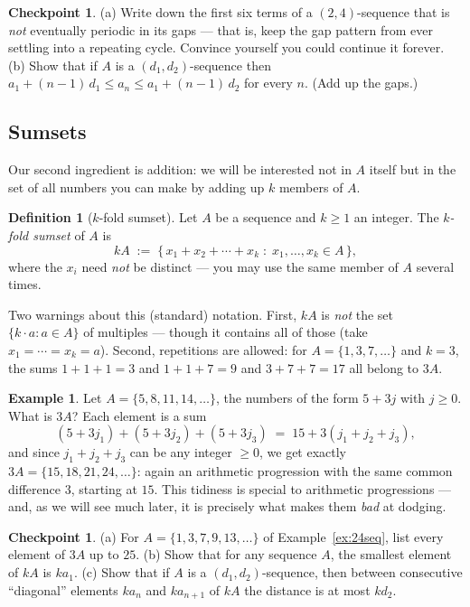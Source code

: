 \documentclass[11pt,reqno]{amsart}
\theoremstyle{plain}
\theoremstyle{definition}
\newtheorem{definition}[theorem]{Definition}
\newtheorem{example}[theorem]{Example}
\newtheorem{checkpoint}[theorem]{Checkpoint}   %
\theoremstyle{remark}
\begin{document}
\begin{checkpoint}
(a) Write down the first six terms of a $(2,4)$-sequence that is \emph{not} eventually
periodic in its gaps --- that is, keep the gap pattern from ever settling into a
repeating cycle. Convince yourself you could continue it forever.
(b) Show that if $A$ is a $(d_1,d_2)$-sequence then
$a_1 + (n-1)\,d_1 \le a_n \le a_1 + (n-1)\,d_2$ for every $n$. (Add up the gaps.)
\end{checkpoint}

\subsection{Sumsets}

Our second ingredient is addition: we will be interested not in $A$ itself but in the
set of all numbers you can make by adding up $k$ members of $A$.

\begin{definition}[$k$-fold sumset]\label{def:sumset}
Let $A$ be a sequence and $k \ge 1$ an integer. The \emph{$k$-fold sumset} of $A$ is
\[
  kA \;:=\; \{\, x_1 + x_2 + \cdots + x_k \;:\; x_1, \dots, x_k \in A \,\},
\]
where the $x_i$ need \emph{not} be distinct --- you may use the same member of $A$
several times.
\end{definition}

Two warnings about this (standard) notation. First, $kA$ is \emph{not} the set
$\{k \cdot a : a \in A\}$ of multiples --- though it contains all of those (take
$x_1 = \cdots = x_k = a$). Second, repetitions are allowed: for
$A = \{1, 3, 7, \dots\}$ and $k = 3$, the sums $1+1+1 = 3$ and $1+1+7 = 9$ and
$3+7+7 = 17$ all belong to $3A$.

\begin{example}\label{ex:sumset-ap}
Let $A = \{5, 8, 11, 14, \dots\}$, the numbers of the form $5 + 3j$ with $j \ge 0$.
What is $3A$? Each element is a sum
\[
  (5 + 3j_1) + (5 + 3j_2) + (5 + 3j_3) \;=\; 15 + 3(j_1 + j_2 + j_3),
\]
and since $j_1 + j_2 + j_3$ can be any integer $\ge 0$, we get exactly
$3A = \{15, 18, 21, 24, \dots\}$: again an arithmetic progression with the same common
difference $3$, starting at $15$. This tidiness is special to arithmetic progressions
--- and, as we will see much later, it is precisely what makes them \emph{bad} at
dodging.
\end{example}

\begin{checkpoint}\label{chk:sumset}
(a) For $A = \{1, 3, 7, 9, 13, \dots\}$ of Example~\ref{ex:24seq}, list every element
of $3A$ up to $25$.
(b) Show that for any sequence $A$, the smallest element of $kA$ is $k a_1$.
(c) Show that if $A$ is a $(d_1,d_2)$-sequence, then between consecutive ``diagonal''
elements $k a_n$ and $k a_{n+1}$ of $kA$ the distance is at most $k d_2$.
\end{checkpoint}
\end{document}
